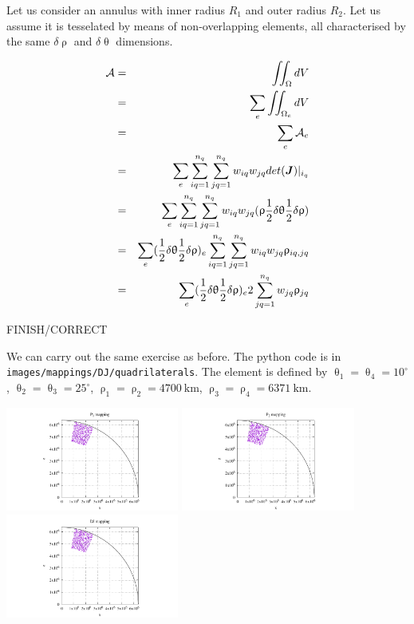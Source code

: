 Let us consider an annulus with inner radius $R_1$ and outer radius $R_2$. Let us assume it is tesselated 
by means of non-overlapping elements, all characterised by the same $\delta\uprho$ and $\delta\uptheta$ 
dimensions.


\begin{eqnarray}
{\cal A}
&=&\iint_\Omega dV  \nonumber\\
&=&\sum_e \iint_{\Omega_e} dV  \nonumber\\
&=&\sum_e {\cal A}_e   \nonumber\\
&=&\sum_e \sum_{iq=1}^{n_q} \sum_{jq=1}^{n_q}   w_{iq} w_{jq} det({\bm J})|_{i_q} \nonumber\\
&=&\sum_e \sum_{iq=1}^{n_q} \sum_{jq=1}^{n_q}   w_{iq} w_{jq} (\uprho  \frac12 \delta \uptheta  \frac12 \delta\uprho ) \nonumber\\
&=&\sum_e  (\frac12 \delta \uptheta  \frac12 \delta\uprho)_e  \sum_{iq=1}^{n_q} \sum_{jq=1}^{n_q}   w_{iq} w_{jq} \uprho_{iq,jq} \nonumber\\
&=&\sum_e  (\frac12 \delta \uptheta  \frac12 \delta\uprho)_e  2  \sum_{jq=1}^{n_q}  w_{jq} \uprho_{jq} \nonumber\\
\end{eqnarray}

FINISH/CORRECT


\newpage 
We can carry out the same exercise as before.
The python code is in {\tt images/mappings/DJ/quadrilaterals}.
The element is defined by 
$\uptheta_1=\uptheta_4=10^\circ$,
$\uptheta_2=\uptheta_3=25^\circ$,
$\uprho_1=\uprho_2=4700~\si{\km}$,
$\uprho_3=\uprho_4=6371~\si{\km}$.

\begin{center}
\includegraphics[width=5.7cm]{images/mappings/DJ/quadrilaterals/xz_P1.pdf}
\includegraphics[width=5.7cm]{images/mappings/DJ/quadrilaterals/xz_P2.pdf}
\includegraphics[width=5.7cm]{images/mappings/DJ/quadrilaterals/xz_DJ.pdf}
\end{center}

